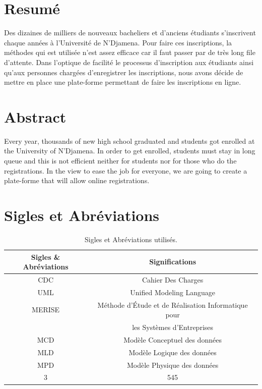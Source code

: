 \documentclass[12pt,a4paper]{article}
\begin{document}
	\newpage
	\section*{Resumé}
	Des dizaines de milliers de nouveaux bacheliers et d'anciens étudiants s’inscrivent chaque années à l’Université de N’Djamena. Pour faire ces inscriptions, la méthodes qui est utilisée n’est assez efficace car il faut passer par de très long file d’attente. Dans l’optique de facilité le processus d’inscription aux étudiants ainsi qu’aux personnes chargées d’enregistrer les inscriptions, nous avons décide de mettre en place une plate-forme permettant de faire les inscriptions en ligne.
	
	\section*{Abstract}
	Every year, thousands of new high school graduated and students got enrolled at the University of N'Djamena. In order to get enrolled, students must stay in long queue and this is not efficient neither for students nor for those who do the registrations. In the view to ease the job for everyone, we are going to create a plate-forme that will allow online registrations.
	
	\newpage
	\listoffigures
	\listoftables
	
	\newpage
	\section*{Sigles et Abréviations}
	\begin{table}[h!]
		\centering
		\begin{tabular}{||c | c||} 
			\hline
			Sigles \& Abréviations & Significations \\ [0.5ex] 
			\hline \hline
			CDC & Cahier Des Charges \\
			\hline 
			UML & Unified Modeling Language \\
			\hline
			MERISE & Méthode d’Étude et de Réalisation Informatique pour\\ & les Systèmes d’Entreprises \\
			\hline
			MCD & Modèle Conceptuel des données \\
			\hline
			MLD & Modèle Logique des données \\
			\hline
			MPD & Modèle Physique des données \\
			\hline
			3 & 545 \\
			\hline
		\end{tabular}
		\caption{Sigles et Abréviations utilisés.}
		\label{table:sigle_abv}
	\end{table}
\end{document}
